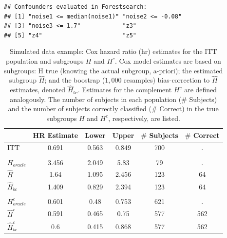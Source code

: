 \documentclass[smallextended]{svjour3}
\makeatletter
\newenvironment{kframe}{%
 \def\at@end@of@kframe{}%
 \ifinner\ifhmode%
  \def\at@end@of@kframe{\end{minipage}}%
  \begin{minipage}{\columnwidth}%
 \fi\fi%
 \def\FrameCommand##1{\hskip\@totalleftmargin \hskip-\fboxsep
 \colorbox{shadecolor}{##1}\hskip-\fboxsep
     \hskip-\linewidth \hskip-\@totalleftmargin \hskip\columnwidth}%
 \MakeFramed {\advance\hsize-\width
   \@totalleftmargin\z@ \linewidth\hsize
   \@setminipage}}%
 {\par\unskip\endMakeFramed%
 \at@end@of@kframe}
\newenvironment{knitrout}{}{} %
\makeatother
\begin{document}
\begin{knitrout}
\color{fgcolor}\begin{kframe}
\begin{verbatim}
## Confounders evaluated in Forestsearch:
## [1] "noise1 <= median(noise1)" "noise2 <= -0.08"         
## [3] "noise3 <= 1.7"            "z3"                      
## [5] "z4"                       "z5"
\end{verbatim}
\end{kframe}
\end{knitrout}





\begin{table}

\caption{\label{tab:simex_tab}\label{tab:simex} Simulated data example: Cox hazard ratio (hr) estimates for the ITT population and subgroups $H$ and $H^{c}$.
Cox model estimates are based on subgroups: H true (knowing the actual subgroup, a-priori); the estimated subgroup $\hat{H}$; and 
the boostrap ($1,000$ resamples) bias-correction to $\hat{H}$ estimates, denoted $\hat{H}_{bc}$.  Estimates for the complement $H^{c}$ are defined analogously.
The number of subjects in each population ($\#$ Subjects) and the number of subjects correctly classified ($\#$ Correct) in the true subgroups $H$ and $H^{c}$, respectively, are listed.}
\centering
\fontsize{9}{11}\selectfont
\begin{tabular}[t]{lccccc}
\toprule
  & HR Estimate & Lower & Upper & $\#$ Subjects & $\#$ Correct\\
\midrule
ITT & 0.691 & 0.563 & 0.849 & 700 & .\\
\addlinespace[0.3em]
\multicolumn{6}{l}{\textbf{H subgroup estimates}}\\
\hspace{1em}$H_{oracle}$ & 3.456 & 2.049 & 5.83 & 79 & .\\
\hspace{1em}$\hat{H}$ & 1.64 & 1.095 & 2.456 & 123 & 64\\
\hspace{1em}$\hat{H}_{bc}$ & 1.409 & 0.829 & 2.394 & 123 & 64\\
\addlinespace[0.3em]
\multicolumn{6}{l}{\textbf{H-complement subgroup estimates}}\\
\hspace{1em}$H^{c}_{oracle}$ & 0.601 & 0.48 & 0.753 & 621 & .\\
\hspace{1em}$\hat{H}^{c}$ & 0.591 & 0.465 & 0.75 & 577 & 562\\
\hspace{1em}$\hat{H}^{c}_{bc}$ & 0.6 & 0.415 & 0.868 & 577 & 562\\
\bottomrule
\end{tabular}
\end{table}





\end{document}
